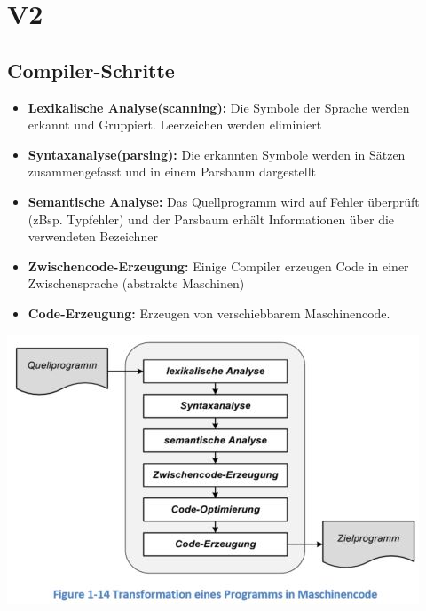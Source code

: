 \section{V2}
\subsection{Compiler-Schritte}
\vspace{-0.5cm}
\begin{multicols}{2}
    \begin{minipage}{\linewidth}
    \begin{itemize}
        \item \textbf{Lexikalische Analyse(scanning):}\newline
        Die Symbole der Sprache werden erkannt und Gruppiert. Leerzeichen werden eliminiert
        \item \textbf{Syntaxanalyse(parsing):}\newline
         Die erkannten Symbole werden in Sätzen zusammengefasst und in einem Parsbaum dargestellt
        \item \textbf{Semantische Analyse:}\newline
         Das Quellprogramm wird auf Fehler überprüft (zBsp. Typfehler) und der Parsbaum erhält Informationen über die verwendeten Bezeichner
        \item \textbf{Zwischencode-Erzeugung:}\newline
         Einige Compiler erzeugen Code in einer Zwischensprache (abstrakte Maschinen)
        \item \textbf{Code-Erzeugung:}\newline
         Erzeugen von verschiebbarem Maschinencode.      
    \end{itemize}
\end{minipage}

    \includegraphics[width=\linewidth]{images/CompilerWorkflow2}
\end{multicols}

